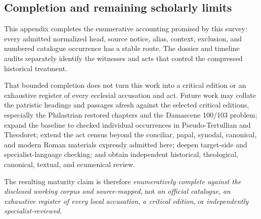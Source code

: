 \subsection{Completion and remaining scholarly limits}

This appendix completes the enumerative accounting promised by this survey: every admitted normalized head, source notice, alias, context, exclusion, and numbered catalogue occurrence has a stable route. The dossier and timeline audits separately identify the witnesses and acts that control the compressed historical treatment.

That bounded completion does not turn this work into a critical edition or an exhaustive register of every ecclesial accusation and act. Future work may collate the patristic headings and passages afresh against the selected critical editions, especially the Philastrian restored chapters and the Damascene 100/103 problem; expand the baseline to checked individual occurrences in Pseudo-Tertullian and Theodoret; extend the act census beyond the conciliar, papal, synodal, canonical, and modern Roman materials expressly admitted here; deepen target-side and specialist-language checking; and obtain independent historical, theological, canonical, textual, and ecumenical review.

The resulting maturity claim is therefore \emph{enumeratively complete against the disclosed working corpus and source-mapped}, not \emph{an official catalogue}, \emph{an exhaustive register of every local accusation}, \emph{a critical edition}, or \emph{independently specialist-reviewed}.

\endgroup
